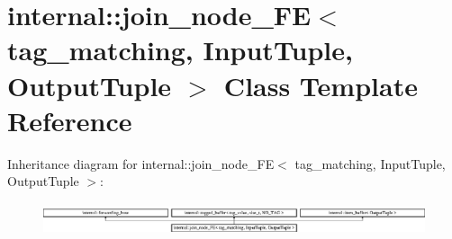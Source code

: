 \hypertarget{classinternal_1_1join__node__FE_3_01tag__matching_00_01InputTuple_00_01OutputTuple_01_4}{}\section{internal\+:\+:join\+\_\+node\+\_\+\+F\+E$<$ tag\+\_\+matching, Input\+Tuple, Output\+Tuple $>$ Class Template Reference}
\label{classinternal_1_1join__node__FE_3_01tag__matching_00_01InputTuple_00_01OutputTuple_01_4}
Inheritance diagram for internal\+:\+:join\+\_\+node\+\_\+\+F\+E$<$ tag\+\_\+matching, Input\+Tuple, Output\+Tuple $>$\+:\begin{figure}[H]
\begin{center}
\leavevmode
\includegraphics[height=0.962199cm]{classinternal_1_1join__node__FE_3_01tag__matching_00_01InputTuple_00_01OutputTuple_01_4}
\end{center}
\end{figure}
